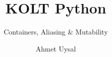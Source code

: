 
\usepackage{../KU-Beamer-Template/style/koc} 
\usepackage{minted}
\usepackage{upquote}
\usepackage{graphicx}
\usepackage{tikz}
\usetikzlibrary{shapes.symbols,positioning, chains}

\title{KOLT Python}
\subtitle{Containers, Aliasing \& Mutability} 
\date{}
\author{Ahmet Uysal}




    \maketitle


